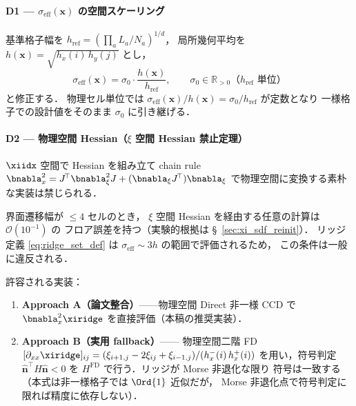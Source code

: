 \paragraph{D1 — $\sigma_\text{eff}(\bm{x})$ の空間スケーリング}
基準格子幅を $h_\text{ref}=(\prod_{a} L_a/N_a)^{1/d}$，
局所幾何平均を $h(\bm{x})=\sqrt{h_x(i)\,h_y(j)}$ とし，
\begin{equation}
  \sigma_\text{eff}(\bm{x}) = \sigma_0 \cdot \frac{h(\bm{x})}{h_\text{ref}},
  \qquad \sigma_0 \in \mathbb{R}_{>0}\text{（}h_\text{ref}\text{ 単位）}
  \label{eq:sigma_eff}
\end{equation}
と修正する．
物理セル単位では $\sigma_\text{eff}(\bm{x})/h(\bm{x}) = \sigma_0/h_\text{ref}$ が定数となり
一様格子での設計値をそのまま $\sigma_0$ に引き継げる．

\paragraph{D2 — 物理空間 Hessian（$\xi$ 空間 Hessian 禁止定理）}
$\xiidx$ 空間で Hessian を組み立て
chain rule $\bnabla_x^2 = J^{\!\top}\bnabla_\xi^2 J
+ (\bnabla_\xi J^{\!\top})\bnabla_\xi$
で物理空間に変換する素朴な実装は禁じられる．

\begin{remark}\label{rem:xi_hessian_forbidden}
界面遷移幅が $\le 4$ セルのとき，
$\xi$ 空間 Hessian を経由する任意の計算は $\mathcal{O}(10^{-1})$ の
フロア誤差を持つ（実験的根拠は §~\ref{sec:xi_sdf_reinit}）．
リッジ定義 \eqref{eq:ridge_set_def} は
$\sigma_\text{eff}\sim 3h$ の範囲で評価されるため，
この条件は一般に違反される．
\end{remark}

許容される実装：
\begin{enumerate}
  \item\textbf{Approach A（論文整合）}——物理空間 Direct 非一様 CCD
        で $\bnabla_x^2\xiridge$ を直接評価（本稿の推奨実装）．
  \item\textbf{Approach B（実用 fallback）}——
        物理空間二階 FD
        $[\partial_{xx}\xiridge]_{ij}
        = (\xi_{i+1,j}-2\xi_{ij}+\xi_{i-1,j})/(h_x^-(i)\,h_x^+(i))$
        を用い，符号判定 $\hat{\bm{n}}^{\!\top}H\hat{\bm{n}}<0$ を
        $H^{\text{FD}}$ で行う．リッジが Morse 非退化な限り
        符号は一致する（本式は非一様格子では $\Ord{1}$ 近似だが，
        Morse 非退化点で符号判定に限れば精度に依存しない）．
\end{enumerate}


